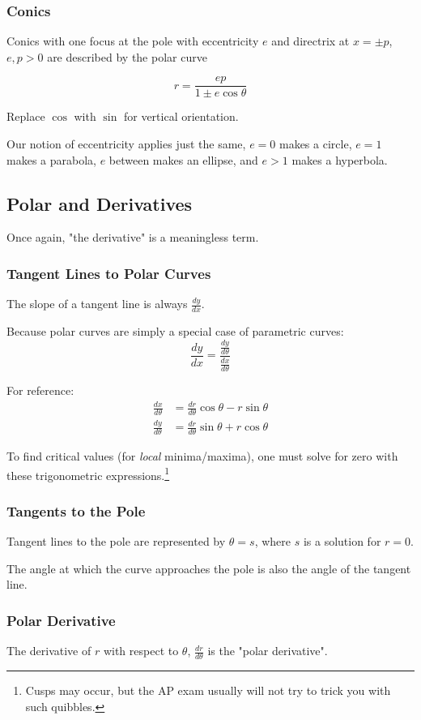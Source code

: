 \documentclass{article}
\begin{document}
\subsubsection{Conics}
Conics with one focus at the pole with eccentricity $e$ and directrix at $x = \pm p$, $e,p > 0$ are described by the polar curve

$$r = \frac{ep}{1\pm e\cos{\theta}}$$

Replace $\cos$ with $\sin$ for vertical orientation.

Our notion of eccentricity applies just the same, $e=0$ makes a circle, $e=1$ makes a parabola, $e$ between makes an ellipse, and $e > 1$ makes a hyperbola.
\subsection{Polar and Derivatives}
Once again, "the derivative" is a meaningless term.

\subsubsection{Tangent Lines to Polar Curves} \label{polar-derivatives}
The slope of a tangent line is always $\frac{dy}{dx}$.

Because polar curves are simply a special case of parametric curves:
$$\frac{dy}{dx} = \frac{\frac{dy}{d\theta}}{\frac{dx}{d\theta}}$$

For reference:
\begin{align*}
    \frac{dx}{d\theta} &= \frac{dr}{d\theta}\cos{\theta}-r\sin{\theta}\\
    \frac{dy}{d\theta} &= \frac{dr}{d\theta}\sin{\theta}+r\cos{\theta}
\end{align*}

To find critical values (for \emph{local} minima/maxima), one must solve for zero with these trigonometric expressions.\footnote{Cusps may occur, but the AP exam usually will not try to trick you with such quibbles.}

\subsubsection{Tangents to the Pole}
Tangent lines to the pole are represented by $\theta = s$, where $s$ is a solution for $r = 0$.

The angle at which the curve approaches the pole is also the angle of the tangent line.

\subsubsection{Polar Derivative}
The derivative of $r$ with respect to $\theta$, $\frac{dr}{d\theta}$ is the "polar derivative".
\end{document}
